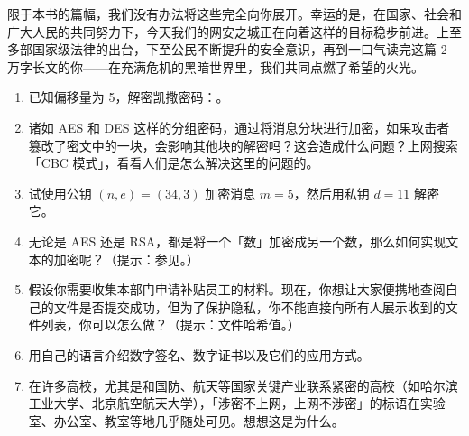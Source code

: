 限于本书的篇幅，我们没有办法将这些完全向你展开。幸运的是，在国家、社会和广大人民的共同努力下，今天我们的网安之城正在向着这样的目标稳步前进。上至多部国家级法律的出台，下至公民不断提升的安全意识，再到一口气读完这篇 2 万字长文的你——在充满危机的黑暗世界里，我们共同点燃了希望的火光。

\practice

\begin{enumerate}
  \item 已知偏移量为 5，解密凯撒密码：。
  \item 诸如 AES 和 DES 这样的分组密码，通过将消息分块进行加密，如果攻击者篡改了密文中的一块，会影响其他块的解密吗？这会造成什么问题？上网搜索「CBC 模式」，看看人们是怎么解决这里的问题的。
  \item 试使用公钥 $(n,e)=(34, 3)$ 加密消息 $m=5$，然后用私钥 $d=11$ 解密它。
  \item 无论是 AES 还是 RSA，都是将一个「数」加密成另一个数，那么如何实现文本的加密呢？（提示：参见。）
  \item 假设你需要收集本部门申请补贴员工的材料。现在，你想让大家便携地查阅自己的文件是否提交成功，但为了保护隐私，你不能直接向所有人展示收到的文件列表，你可以怎么做？（提示：文件哈希值。）
  \item 用自己的语言介绍数字签名、数字证书以及它们的应用方式。
  \item 在许多高校，尤其是和国防、航天等国家关键产业联系紧密的高校（如哈尔滨工业大学、北京航空航天大学），「涉密不上网，上网不涉密」的标语在实验室、办公室、教室等地几乎随处可见。想想这是为什么。
\end{enumerate}
